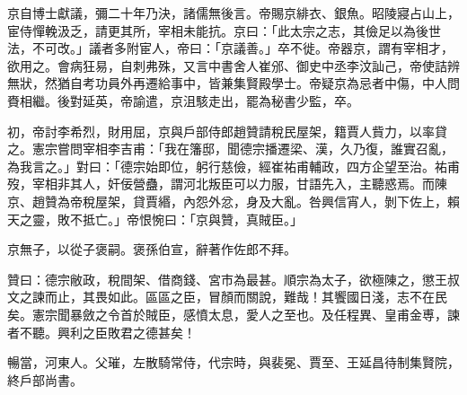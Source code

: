 \begin{pinyinscope}
 京自博士獻議，彌二十年乃決，諸儒無後言。帝賜京緋衣、銀魚。昭陵寢占山上，宦侍憚輓汲乏，請更其所，宰相未能抗。京曰：「此太宗之志，其儉足以為後世法，不可改。」議者多附宦人，帝曰：「京議善。」卒不徙。帝器京，謂有宰相才，欲用之。會病狂易，自刺弗殊，又言中書舍人崔邠、御史中丞李汶訕己，帝使詰辨無狀，然猶自考功員外再遷給事中，皆兼集賢殿學士。帝疑京為忌者中傷，中人問賚相繼。後對延英，帝諭遣，京沮駭走出，罷為秘書少監，卒。



 初，帝討李希烈，財用屈，京與戶部侍郎趙贊請稅民屋架，籍賈人貲力，以率貸之。憲宗嘗問宰相李吉甫：「我在籓邸，聞德宗播遷梁、漢，久乃復，誰實召亂，為我言之。」對曰：「德宗始即位，躬行慈儉，經崔祐甫輔政，四方企望至治。祐甫歿，宰相非其人，奸佞營蠱，謂河北叛臣可以力服，甘語先入，主聽惑焉。而陳京、趙贊為帝稅屋架，貸賈緡，內怨外忿，身及大亂。咎興信宵人，剝下佐上，賴天之靈，敗不抵亡。」帝恨惋曰：「京與贊，真賊臣。」



 京無子，以從子褒嗣。褒孫伯宣，辭著作佐郎不拜。



 贊曰：德宗敝政，稅間架、借商錢、宮市為最甚。順宗為太子，欲極陳之，懲王叔文之諫而止，其畏如此。區區之臣，冒顏而關說，難哉！其饗國日淺，志不在民矣。憲宗聞暴斂之令首於賊臣，感憤太息，愛人之至也。及任程異、皇甫金尃，諫者不聽。興利之臣敗君之德甚矣！



 暢當，河東人。父璀，左散騎常侍，代宗時，與裴冕、賈至、王延昌待制集賢院，終戶部尚書。




\end{pinyinscope}
